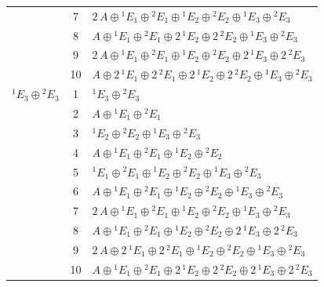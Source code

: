 \documentclass[11pt]{article}
\begin{document}
\begin{longtable}{l c p{}}
 & 7 & $2\,A\oplus {}^{1}E_{1}\oplus {}^{2}E_{1}\oplus {}^{1}E_{2}\oplus {}^{2}E_{2}\oplus {}^{1}E_{3}\oplus {}^{2}E_{3}$\\
 & 8 & $A\oplus {}^{1}E_{1}\oplus {}^{2}E_{1}\oplus 2\,{}^{1}E_{2}\oplus 2\,{}^{2}E_{2}\oplus {}^{1}E_{3}\oplus {}^{2}E_{3}$\\
 & 9 & $2\,A\oplus {}^{1}E_{1}\oplus {}^{2}E_{1}\oplus {}^{1}E_{2}\oplus {}^{2}E_{2}\oplus 2\,{}^{1}E_{3}\oplus 2\,{}^{2}E_{3}$\\
 & 10 & $A\oplus 2\,{}^{1}E_{1}\oplus 2\,{}^{2}E_{1}\oplus 2\,{}^{1}E_{2}\oplus 2\,{}^{2}E_{2}\oplus {}^{1}E_{3}\oplus {}^{2}E_{3}$\\
\hline
${}^{1}E_{3}\oplus {}^{2}E_{3}$ & 1 & ${}^{1}E_{3}\oplus {}^{2}E_{3}$\\
 & 2 & $A\oplus {}^{1}E_{1}\oplus {}^{2}E_{1}$\\
 & 3 & ${}^{1}E_{2}\oplus {}^{2}E_{2}\oplus {}^{1}E_{3}\oplus {}^{2}E_{3}$\\
 & 4 & $A\oplus {}^{1}E_{1}\oplus {}^{2}E_{1}\oplus {}^{1}E_{2}\oplus {}^{2}E_{2}$\\
 & 5 & ${}^{1}E_{1}\oplus {}^{2}E_{1}\oplus {}^{1}E_{2}\oplus {}^{2}E_{2}\oplus {}^{1}E_{3}\oplus {}^{2}E_{3}$\\
 & 6 & $A\oplus {}^{1}E_{1}\oplus {}^{2}E_{1}\oplus {}^{1}E_{2}\oplus {}^{2}E_{2}\oplus {}^{1}E_{3}\oplus {}^{2}E_{3}$\\
 & 7 & $2\,A\oplus {}^{1}E_{1}\oplus {}^{2}E_{1}\oplus {}^{1}E_{2}\oplus {}^{2}E_{2}\oplus {}^{1}E_{3}\oplus {}^{2}E_{3}$\\
 & 8 & $A\oplus {}^{1}E_{1}\oplus {}^{2}E_{1}\oplus {}^{1}E_{2}\oplus {}^{2}E_{2}\oplus 2\,{}^{1}E_{3}\oplus 2\,{}^{2}E_{3}$\\
 & 9 & $2\,A\oplus 2\,{}^{1}E_{1}\oplus 2\,{}^{2}E_{1}\oplus {}^{1}E_{2}\oplus {}^{2}E_{2}\oplus {}^{1}E_{3}\oplus {}^{2}E_{3}$\\
 & 10 & $A\oplus {}^{1}E_{1}\oplus {}^{2}E_{1}\oplus 2\,{}^{1}E_{2}\oplus 2\,{}^{2}E_{2}\oplus 2\,{}^{1}E_{3}\oplus 2\,{}^{2}E_{3}$\\
\hline
\end{longtable}
\end{document}
